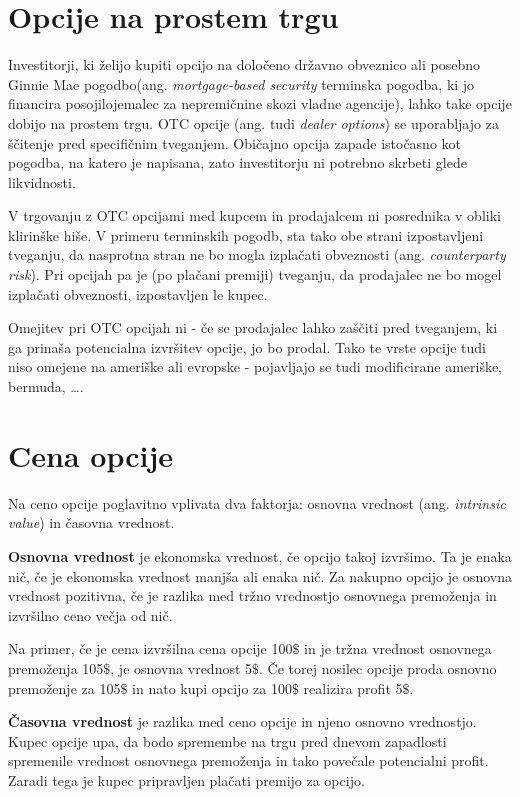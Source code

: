 \documentclass[a4paper]{article}
\begin{document}
\section{Opcije na prostem trgu}
Investitorji, ki želijo kupiti opcijo na določeno državno obveznico ali posebno Ginnie Mae pogodbo(ang. \textit{mortgage-based security}
terminska pogodba, ki jo financira posojilojemalec za nepremičnine skozi vladne agencije), lahko take opcije dobijo na prostem trgu.
OTC opcije (ang. tudi \textit{dealer options}) se uporabljajo za ščitenje pred specifičnim tveganjem. Običajno opcija zapade istočasno
kot pogodba, na katero je napisana, zato investitorju ni potrebno skrbeti glede likvidnosti.

V trgovanju z OTC opcijami med kupcem in prodajalcem ni posrednika v obliki klirinške hiše. V primeru terminskih pogodb, sta tako
obe strani izpostavljeni tveganju, da nasprotna stran ne bo mogla izplačati obveznosti (ang. \textit{counterparty risk}). Pri opcijah
pa je (po plačani premiji) tveganju, da prodajalec ne bo mogel izplačati obveznosti, izpostavljen le kupec.

Omejitev pri OTC opcijah ni - če se prodajalec lahko zaščiti pred tveganjem, ki ga prinaša potencialna izvršitev opcije, jo bo prodal.
Tako te vrste opcije tudi niso omejene na ameriške ali evropske - pojavljajo se tudi modificirane ameriške, bermuda, \ldots.

\section{Cena opcije}
Na ceno opcije poglavitno vplivata dva faktorja: osnovna vrednost (ang. \textit{intrinsic value}) in časovna vrednost.

\textbf{Osnovna vrednost} je ekonomska vrednost, če opcijo takoj izvršimo. Ta je enaka nič, če je ekonomska vrednost manjša ali enaka nič.
Za nakupno opcijo je osnovna vrednost pozitivna, če je razlika med tržno vrednostjo osnovnega premoženja in izvršilno ceno večja od nič.

Na primer, če je cena izvršilna cena opcije 100$\$$ in je tržna vrednost osnovnega premoženja 105$\$$, je osnovna vrednost 5$\$$. 
Če torej nosilec opcije proda osnovno premoženje za 105$\$$ in nato kupi opcijo za 100$\$$ realizira profit 5$\$$.

\textbf{Časovna vrednost} je razlika med ceno opcije in njeno osnovno vrednostjo. Kupec opcije upa, da bodo spremembe na trgu pred
dnevom zapadlosti spremenile vrednost osnovnega premoženja in tako povečale potencialni profit. Zaradi tega je kupec pripravljen plačati
premijo za opcijo. 
\end{document}
